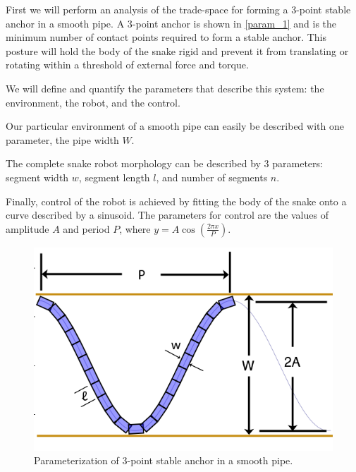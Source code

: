 First we will perform an analysis of the trade-space for forming a 3-point stable anchor in a smooth pipe. A 3-point anchor is shown in \autoref{param_1} and is the minimum number of contact points required to form a stable anchor. This posture will hold the body of the snake rigid and prevent it from translating or rotating within a threshold of external force and torque.

We will define and quantify the parameters that describe this system: the environment, the robot, and the control.

Our particular environment of a smooth pipe can easily be described with one parameter, the pipe width $W$.

The complete snake robot morphology can be described by 3 parameters: segment width $w$, segment length $l$, and number of segments $n$.

Finally, control of the robot is achieved by fitting the body of the snake onto a curve described by a sinusoid. The parameters for control are the values of amplitude $A$ and period $P$, where $y = A \cos(\frac{2 \pi x}{P})$. 

\begin{figure}[htbp]
\centering
\includegraphics[keepaspectratio,width=400pt,height=0.75\textheight]{CurveDiagram.png}
\caption{Parameterization of 3-point stable anchor in a smooth pipe.}
\label{param_1}
\end{figure}






